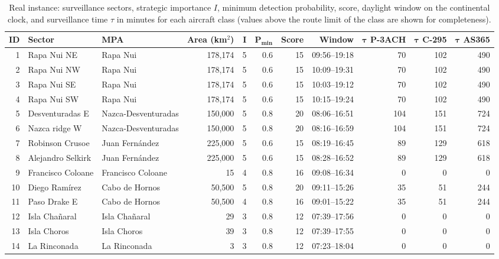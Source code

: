\begin{table}[!ht]
\centering
\caption{Real instance: surveillance sectors, strategic importance $I$, minimum detection probability, score, daylight window on the continental clock, and surveillance time $\tau$ in minutes for each aircraft class (values above the route limit of the class are shown for completeness).\label{tab6}}
\footnotesize\setlength{\tabcolsep}{3pt}
\begin{tabular*}{\textwidth}{@{\extracolsep\fill}rllrrrrrrrr@{\extracolsep\fill}}
\toprule
\textbf{ID} & \textbf{Sector} & \textbf{MPA} & \textbf{Area (km$^2$)} & $\boldsymbol{I}$ & $\boldsymbol{P_{\min}}$ & \textbf{Score} & \textbf{Window} & $\boldsymbol{\tau}$ \textbf{P-3ACH} & $\boldsymbol{\tau}$ \textbf{C-295} & $\boldsymbol{\tau}$ \textbf{AS365} \\
\midrule
1 & Rapa Nui NE & Rapa Nui & 178,174 & 5 & 0.6 & 15 & 09:56--19:18 & 70 & 102 & 490 \\
2 & Rapa Nui NW & Rapa Nui & 178,174 & 5 & 0.6 & 15 & 10:09--19:31 & 70 & 102 & 490 \\
3 & Rapa Nui SE & Rapa Nui & 178,174 & 5 & 0.6 & 15 & 10:03--19:12 & 70 & 102 & 490 \\
4 & Rapa Nui SW & Rapa Nui & 178,174 & 5 & 0.6 & 15 & 10:15--19:24 & 70 & 102 & 490 \\
5 & Desventuradas E & Nazca-Desventuradas & 150,000 & 5 & 0.8 & 20 & 08:06--16:51 & 104 & 151 & 724 \\
6 & Nazca ridge W & Nazca-Desventuradas & 150,000 & 5 & 0.8 & 20 & 08:16--16:59 & 104 & 151 & 724 \\
7 & Robinson Crusoe & Juan Fern\'andez & 225,000 & 5 & 0.6 & 15 & 08:19--16:45 & 89 & 129 & 618 \\
8 & Alejandro Selkirk & Juan Fern\'andez & 225,000 & 5 & 0.6 & 15 & 08:28--16:52 & 89 & 129 & 618 \\
9 & Francisco Coloane & Francisco Coloane & 15 & 4 & 0.8 & 16 & 09:08--16:34 & 0 & 0 & 0 \\
10 & Diego Ram\'irez & Cabo de Hornos & 50,500 & 5 & 0.8 & 20 & 09:11--15:26 & 35 & 51 & 244 \\
11 & Paso Drake E & Cabo de Hornos & 50,500 & 4 & 0.8 & 16 & 09:01--15:22 & 35 & 51 & 244 \\
12 & Isla Cha\~naral & Isla Cha\~naral & 29 & 3 & 0.8 & 12 & 07:39--17:56 & 0 & 0 & 0 \\
13 & Isla Choros & Isla Choros & 39 & 3 & 0.8 & 12 & 07:39--17:55 & 0 & 0 & 0 \\
14 & La Rinconada & La Rinconada & 3 & 3 & 0.8 & 12 & 07:23--18:04 & 0 & 0 & 0 \\
\bottomrule
\end{tabular*}
\end{table}
